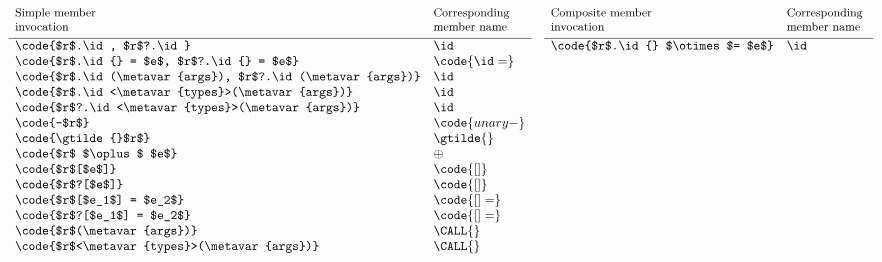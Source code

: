 \documentclass[makeidx]{article}
\begin{document}
{\begin{figure}[h]
  \begin{minipage}[t]{\textwidth}
    \begin{displaymath}
      \hspace{-2mm}\begin{array}[t]{lll}
        \parbox{.22\textwidth}{\small Simple member\\invocation}
        & \parbox{.17\textwidth}{\small Corresponding member name} \\[3mm]
        \hline
        \code{$r$.\id, $r$?.\id}                         & \id \\
        \code{$r$.\id{} = $e$,
          $r$?.\id{} = $e$}                              & \code{\id=} \\
        \code{$r$.\id(\metavar{args}),
          $r$?.\id(\metavar{args})}                      & \id \\
        \code{$r$.\id<\metavar{types}>(\metavar{args})}  & \id \\
        \code{$r$?.\id<\metavar{types}>(\metavar{args})} & \id \\
        \code{-$r$}                                      & \code{unary-} \\
        \code{\gtilde{}$r$}                              & \gtilde{} \\
        \code{$r$ $\oplus$ $e$}                          & \oplus \\
        \code{$r$[$e$]}                                  & \code{[]} \\
        \code{$r$?[$e$]}                                 & \code{[]} \\
        \code{$r$[$e_1$] = $e_2$}                        & \code{[]=} \\
        \code{$r$?[$e_1$] = $e_2$}                       & \code{[]=} \\
        \code{$r$(\metavar{args})}                       & \CALL{} \\
        \code{$r$<\metavar{types}>(\metavar{args})}      & \CALL{} \\
      \end{array}
      \quad
      \begin{array}[t]{ll}
        \parbox{.23\textwidth}{\small Composite member\\invocation}
        & \parbox{.18\textwidth}{\small Corresponding member name} \\[3mm]
        \hline
        \code{$r$.\id{} $\otimes$= $e$}      & \id \\

\end{array}
\end{displaymath}
\end{minipage}
\end{figure}}
\end{document}
